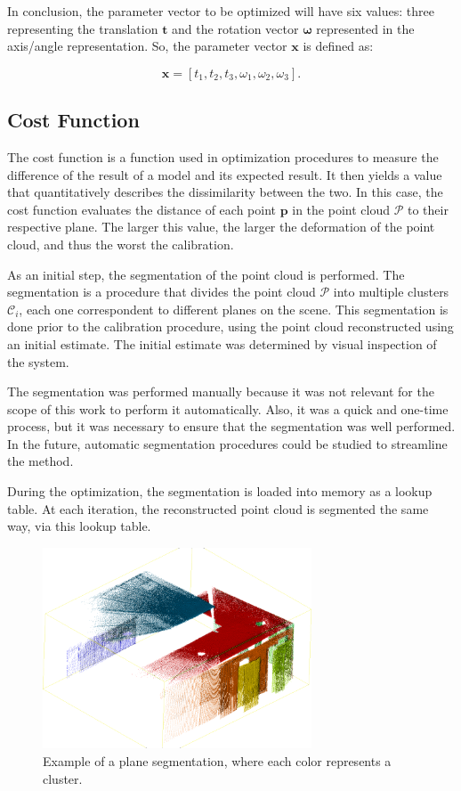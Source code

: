 \documentclass[conference]{IEEEtran}
\begin{document}
In conclusion, the parameter vector to be optimized will have six values: three representing the translation $\bm{t}$ and the rotation vector $\bm{\omega}$ represented in the axis/angle representation. So, the parameter vector $\bm{x}$ is defined as:

\begin{equation}
    \bm{x} = \left[t_1, t_2, t_3, \omega_1, \omega_2, \omega_3\right].
\end{equation}

\subsection{Cost Function}

The cost function is a function used in optimization procedures to measure the difference of the result of a model and its expected result. It then yields a value that quantitatively describes the dissimilarity between the two. In this case, the cost function evaluates the distance of each point $\mathbf{p}$ in the point cloud $\mathcal{P}$ to their respective plane. The larger this value, the larger the deformation of the point cloud, and thus the worst the calibration.

As an initial step, the segmentation of the point cloud is performed. The segmentation is a procedure that divides the point cloud $\mathcal{P}$ into multiple clusters $\mathcal{C}_i$, each one correspondent to different planes on the scene. This segmentation is done prior to the calibration procedure, using the point cloud reconstructed using an initial estimate. The initial estimate was determined by visual inspection of the system.

The segmentation was performed manually because it was not relevant for the scope of this work to perform it automatically. Also, it was a quick and one-time process, but it was necessary to ensure that the segmentation was well performed. In the future, automatic segmentation procedures could be studied to streamline the method.

During the optimization, the segmentation is loaded into memory as a lookup table. At each iteration, the reconstructed point cloud is segmented the same way, via this lookup table.

\begin{figure}[h]
    \centering
    \includegraphics[width=8cm]{images/segmented-pointcloud}
    \caption{Example of a plane segmentation, where each color represents a cluster.}
    \label{figure:cluster-segmentation-1}
\end{figure}
\end{document}
